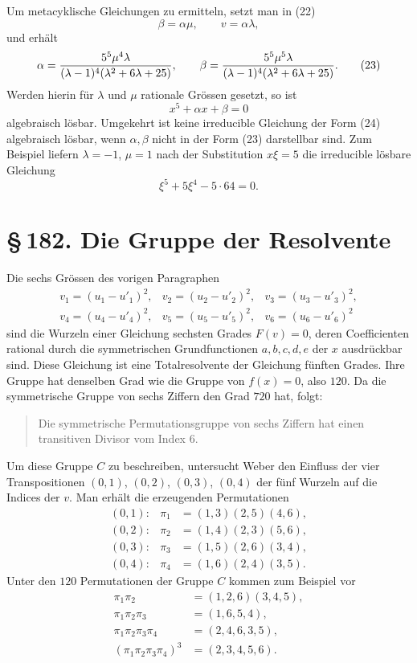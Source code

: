 \documentclass[11pt]{article}
\providecommand{\sect}[2]{\section*{\S\,#1. #2}}
\begin{document}
Um metacyklische Gleichungen zu ermitteln, setzt man in (22)
\[
  \beta=\alpha\mu,
  \qquad v=\alpha\lambda,
\]
und erhält
\[
  \alpha={5^5\mu^4\lambda\over(\lambda-1)^4(\lambda^2+6\lambda+25)},
  \qquad
  \beta={5^5\mu^5\lambda\over(\lambda-1)^4(\lambda^2+6\lambda+25)}. \tag{23}
\]
Werden hierin für $\lambda$ und $\mu$ rationale Grössen gesetzt, so ist
\[
  x^5+\alpha x+
\beta=0                                                     \tag{24}
\]
algebraisch lösbar. Umgekehrt ist keine irreducible Gleichung der Form (24) algebraisch lösbar, wenn $\alpha,
\beta$ nicht in der Form (23) darstellbar sind. Zum Beispiel liefern $\lambda=-1$, $\mu=1$ nach der Substitution $x\xi=5$ die irreducible lösbare Gleichung
\[
  \xi^5+5\xi^4-5\cdot64=0.
\]

\sect{182}{Die Gruppe der Resolvente}

Die sechs Grössen des vorigen Paragraphen
\[
\begin{array}{lll}
 v_1=(u_1-u'_1)^2,& v_2=(u_2-u'_2)^2,& v_3=(u_3-u'_3)^2,\\
 v_4=(u_4-u'_4)^2,& v_5=(u_5-u'_5)^2,& v_6=(u_6-u'_6)^2
\end{array}                                                       \tag{1}
\]
sind die Wurzeln einer Gleichung sechsten Grades $F(v)=0$, deren Coefficienten rational durch die symmetrischen Grundfunctionen $a,b,c,d,e$ der $x$ ausdrückbar sind. Diese Gleichung ist eine Totalresolvente der Gleichung fünften Grades. Ihre Gruppe hat denselben Grad wie die Gruppe von $f(x)=0$, also $120$. Da die symmetrische Gruppe von sechs Ziffern den Grad $720$ hat, folgt:
\begin{quote}
Die symmetrische Permutationsgruppe von sechs Ziffern hat einen transitiven Divisor vom Index $6$.
\end{quote}

Um diese Gruppe $C$ zu beschreiben, untersucht Weber den Einfluss der vier Transpositionen $(0,1)$, $(0,2)$, $(0,3)$, $(0,4)$ der fünf Wurzeln auf die Indices der $v$. Man erhält die erzeugenden Permutationen
\[
\begin{array}{rcl}
(0,1):&\pi_1&=(1,3)(2,5)(4,6),\\
(0,2):&\pi_2&=(1,4)(2,3)(5,6),\\
(0,3):&\pi_3&=(1,5)(2,6)(3,4),\\
(0,4):&\pi_4&=(1,6)(2,4)(3,5).
\end{array}
\]
Unter den $120$ Permutationen der Gruppe $C$ kommen zum Beispiel vor
\[
\begin{aligned}
\pi_1\pi_2&=(1,2,6)(3,4,5),\\
\pi_1\pi_2\pi_3&=(1,6,5,4),\\
\pi_1\pi_2\pi_3\pi_4&=(2,4,6,3,5),\\
(\pi_1\pi_2\pi_3\pi_4)^3&=(2,3,4,5,6).
\end{aligned}
\]
\end{document}
